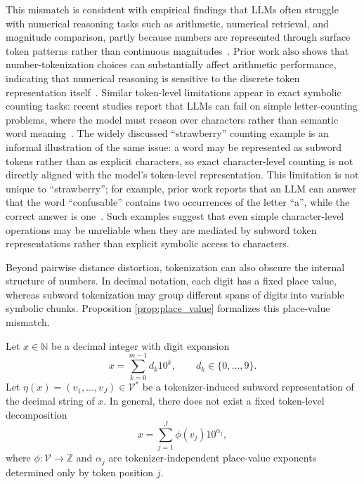 This mismatch is consistent with empirical findings that LLMs often struggle with
numerical reasoning tasks such as arithmetic, numerical retrieval, and magnitude
comparison, partly because numbers are represented through surface token patterns
rather than continuous magnitudes~\citep{li2025exposing}. Prior work also shows that
number-tokenization choices can substantially affect arithmetic performance,
indicating that numerical reasoning is sensitive to the discrete token
representation itself~\citep{singh2024tokenization}. Similar token-level limitations
appear in exact symbolic counting tasks: recent studies report that LLMs can fail
on simple letter-counting problems, where the model must reason over characters
rather than semantic word meaning~\citep{xu2025llm,fu2024large}.
The widely discussed ``strawberry'' counting example is an informal illustration
of the same issue: a word may be represented as subword tokens rather than as
explicit characters, so exact character-level counting is not directly aligned
with the model's token-level representation. This limitation is not unique to
``strawberry''; for example, prior work reports that an LLM can answer that the
word ``confusable'' contains two occurrences of the letter ``a'', while the
correct answer is one~\citep{xu2025llm}. Such examples suggest that even
simple character-level operations may be unreliable when they are mediated by
subword token representations rather than explicit symbolic access to
characters.

Beyond pairwise distance distortion, tokenization can also obscure the internal
structure of numbers. In decimal notation, each digit has a fixed place value,
whereas subword tokenization may group different spans of digits into variable
symbolic chunks. Proposition \ref{prop:place_value} formalizes this place-value mismatch.


\begin{proposition}
\label{prop:place_value}
Let $x \in \mathbb{N}$ be a decimal integer with digit expansion
\begin{equation}
    x = \sum_{k=0}^{m-1} d_k 10^k,
    \qquad d_k \in \{0,\ldots,9\}.
\end{equation}
Let $\eta(x)=(v_1,\ldots,v_J)\in\mathcal{V}^*$ be a tokenizer-induced
subword representation of the decimal string of $x$. In general, there does not
exist a fixed token-level decomposition
\begin{equation}
    x = \sum_{j=1}^{J} \phi(v_j) 10^{\alpha_j},
\end{equation}
where $\phi:\mathcal{V}\rightarrow\mathbb{Z}$ and $\alpha_j$ are tokenizer-independent
place-value exponents determined only by token position $j$.
\end{proposition}

